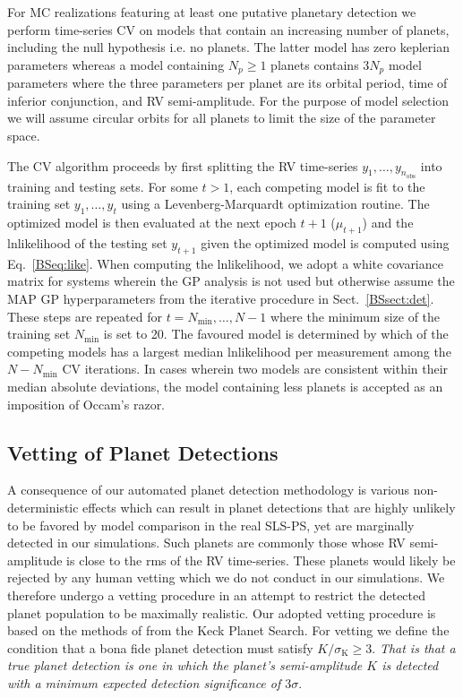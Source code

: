 For MC realizations featuring at least one putative planetary detection
we perform time-series CV 
on models that contain an increasing number of planets, including the null hypothesis i.e. no planets.
The latter model has zero keplerian parameters whereas a model containing $N_p \ge 1$ planets
contains $3N_p$ model parameters where the three parameters per planet are its orbital period,
time of inferior conjunction, and RV semi-amplitude. For the purpose of model selection we
will assume circular orbits for all planets to limit the size of the parameter space.

The CV algorithm proceeds by first splitting the RV time-series $y_1,\dots,y_{n_{\text{obs}}}$ into training and
testing sets. For some $t>1$, each competing model is fit to the training set
$y_1,\dots,y_t$ using a Levenberg-Marquardt optimization routine. The optimized model is then evaluated
at the next epoch $t+1$ ($\mu_{t+1}$) and the lnlikelihood of the testing set $y_{t+1}$ given the optimized
model is computed
using Eq.~\ref{BSeq:like}. When computing the lnlikelihood, we adopt a white covariance matrix for systems
wherein the GP analysis is not used but otherwise assume the MAP GP hyperparameters from the
iterative procedure in Sect.~\ref{BSsect:det}. These steps are repeated for
$t=N_{\text{min}},\dots,N-1$ where the minimum size of the training set $N_{\text{min}}$ is set to 20. 
The favoured model is determined by which of the competing models has a largest median lnlikelihood per
measurement among the $N-N_{\text{min}}$ CV iterations. In cases wherein two models are consistent
within their median absolute deviations, the model containing less planets is accepted as an imposition of
Occam's razor.


\subsection{Vetting of Planet Detections} \label{BSsect:vett}
A consequence of our automated planet detection methodology is
various non-deterministic effects which can result in planet detections that are highly unlikely to be
favored by model comparison in the real SLS-PS, yet are marginally detected in our simulations.
Such planets are commonly those whose RV semi-amplitude is
close to the rms of the RV time-series. These planets would likely be rejected by any human
vetting which we do not conduct in our simulations. We therefore undergo a vetting procedure in an
attempt to restrict the detected planet population to be maximally realistic. Our adopted vetting procedure
is based on the methods of \cite{cumming08} from the Keck Planet Search. For vetting we define 
the condition that a bona fide planet detection must satisfy $K/\sigma_{\text{K}} \ge 3$. \emph{That is
  that a true planet detection is one in which the planet's semi-amplitude $K$ is detected with a minimum
  expected detection significance of $3\sigma$}.

